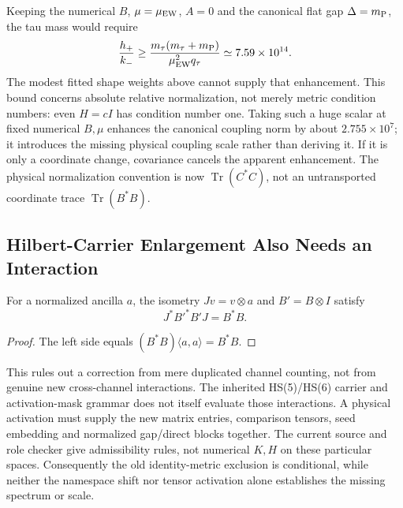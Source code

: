 Keeping the numerical $B$, $\mu=\mu_{\rm EW}$, $A=0$ and the
canonical flat gap $\Delta=m_{\rm P}$, the tau mass would require
\[
 \frac{h_+}{k_-}\geq
 \frac{m_\tau(m_\tau+m_{\rm P})}
      {\mu_{\rm EW}^2q_\tau}
 \simeq7.59\times10^{14}.
\]
The modest fitted shape weights above cannot supply that enhancement.
This bound concerns absolute relative normalization, not merely metric
condition numbers: even $H=cI$ has condition number one. Taking such
a huge scalar at fixed numerical $B,\mu$ enhances the canonical
coupling norm by about $2.755\times10^7$; it introduces the missing
physical coupling scale rather than deriving it. If it is only a
coordinate change, covariance cancels the apparent enhancement.
The physical normalization convention is now $\operatorname{Tr}(C^*C)$,
not an untransported coordinate trace $\operatorname{Tr}(B^*B)$.

\subsection{Hilbert-Carrier Enlargement Also Needs an Interaction}

\begin{proposition}
\label{v480:tensor-identity-extension}
For a normalized ancilla $a$, the isometry $Jv=v\otimes a$ and
$B'=B\otimes I$ satisfy
\[
 J^*B'^*B'J=B^*B.
\]
\end{proposition}
\begin{proof}
The left side equals $(B^*B)\langle a,a\rangle=B^*B$.
\end{proof}

This rules out a correction from mere duplicated channel counting,
not from genuine new cross-channel interactions. The inherited
HS(5)/HS(6) carrier and activation-mask grammar does not itself
evaluate those interactions. A physical activation must supply the
new matrix entries, comparison tensors, seed embedding and normalized
gap/direct blocks together. The current source and role checker give
admissibility rules, not numerical $K,H$ on these particular spaces.
Consequently the old identity-metric exclusion is conditional, while
neither the namespace shift nor tensor activation alone establishes
the missing spectrum or scale.

